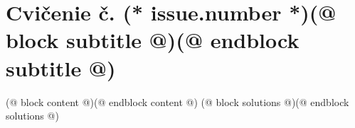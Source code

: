 \documentclass[12pt, twoside]{dgs}
\begin{document}
    \pagestyle{handout}
    \setcounter{section}{(* issue.number - 1 *)}
    \section{Cvičenie č. (* issue.number *)(@ block subtitle @)(@ endblock subtitle @)}
    (@ block content @)(@ endblock content @)
    (@ block solutions @)(@ endblock solutions @)
\end{document}
